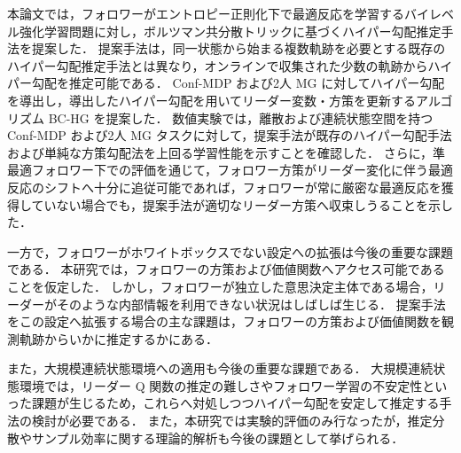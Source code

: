 \documentclass[originalpaper,fleqn]{jsaiart}     %
\begin{document}
本論文では，フォロワーがエントロピー正則化下で最適反応を学習するバイレベル強化学習問題に対し，ボルツマン共分散トリックに基づくハイパー勾配推定手法を提案した．
提案手法は，同一状態から始まる複数軌跡を必要とする既存のハイパー勾配推定手法とは異なり，オンラインで収集された少数の軌跡からハイパー勾配を推定可能である．
Conf-MDP および2人 MG に対してハイパー勾配を導出し，導出したハイパー勾配を用いてリーダー変数・方策を更新するアルゴリズム BC-HG を提案した．
数値実験では，離散および連続状態空間を持つ Conf-MDP および2人 MG タスクに対して，提案手法が既存のハイパー勾配手法および単純な方策勾配法を上回る学習性能を示すことを確認した．
さらに，準最適フォロワー下での評価を通じて，フォロワー方策がリーダー変化に伴う最適反応のシフトへ十分に追従可能であれば，フォロワーが常に厳密な最適反応を獲得していない場合でも，提案手法が適切なリーダー方策へ収束しうることを示した．

一方で，フォロワーがホワイトボックスでない設定への拡張は今後の重要な課題である．
本研究では，フォロワーの方策および価値関数へアクセス可能であることを仮定した．
しかし，フォロワーが独立した意思決定主体である場合，リーダーがそのような内部情報を利用できない状況はしばしば生じる．
提案手法をこの設定へ拡張する場合の主な課題は，フォロワーの方策および価値関数を観測軌跡からいかに推定するかにある．

また，大規模連続状態環境への適用も今後の重要な課題である．
大規模連続状態環境では，リーダー Q 関数の推定の難しさやフォロワー学習の不安定性といった課題が生じるため，これらへ対処しつつハイパー勾配を安定して推定する手法の検討が必要である．
また，本研究では実験的評価のみ行なったが，推定分散やサンプル効率に関する理論的解析も今後の課題として挙げられる．







\end{document}
